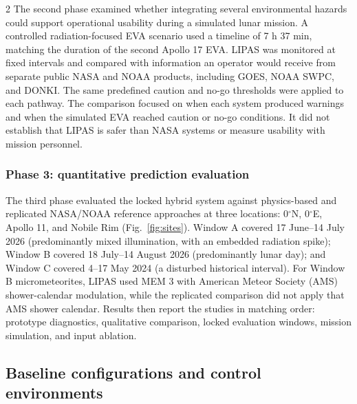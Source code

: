 \begin{multicols}{2}
The second phase examined whether integrating several environmental hazards could support operational usability during a simulated lunar mission. A controlled radiation-focused EVA scenario used a timeline of 7 h 37 min, matching the duration of the second Apollo 17 EVA. LIPAS was monitored at fixed intervals and compared with information an operator would receive from separate public NASA and NOAA products, including GOES, NOAA SWPC, and DONKI. The same predefined caution and no-go thresholds were applied to each pathway. The comparison focused on when each system produced warnings and when the simulated EVA reached caution or no-go conditions. It did not establish that LIPAS is safer than NASA systems or measure usability with mission personnel.

\subsubsection{Phase 3: quantitative prediction evaluation}

The third phase evaluated the locked hybrid system against physics-based and replicated NASA/NOAA reference approaches at three locations: 0$^\circ$N, 0$^\circ$E, Apollo 11, and Nobile Rim (Fig.~\ref{fig:sites}). Window A covered 17 June--14 July 2026 (predominantly mixed illumination, with an embedded radiation spike); Window B covered 18 July--14 August 2026 (predominantly lunar day); and Window C covered 4--17 May 2024 (a disturbed historical interval). For Window B micrometeorites, LIPAS used MEM 3 with American Meteor Society (AMS) shower-calendar modulation, while the replicated comparison did not apply that AMS shower calendar. Results then report the studies in matching order: prototype diagnostics, qualitative comparison, locked evaluation windows, mission simulation, and input ablation.

\subsection{Baseline configurations and control environments}


\end{multicols}
